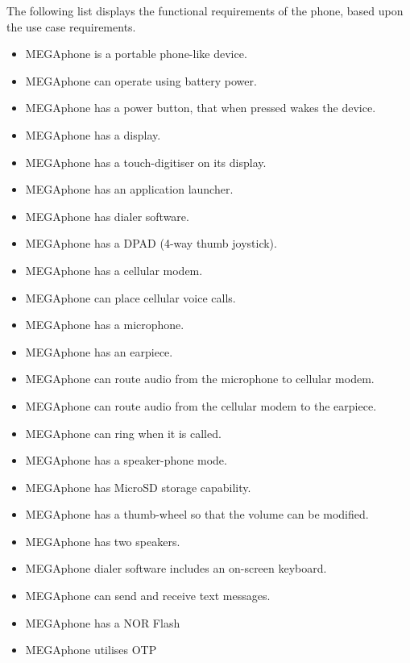 	The following list displays the functional requirements of the phone, based upon the use case requirements.\\
	\begin{itemize}
        \item MEGAphone is a portable phone-like device.
        \item MEGAphone can operate using battery power.
        \item MEGAphone has a power button, that when pressed wakes the device.
        \item MEGAphone has a display.
        \item MEGAphone has a touch-digitiser on its display.
        \item MEGAphone has an application launcher.
        \item MEGAphone has dialer software.
        \item MEGAphone has a DPAD (4-way thumb joystick).
        \item MEGAphone has a cellular modem.
        \item MEGAphone can place cellular voice calls.
        \item MEGAphone has a microphone. 
        \item MEGAphone has an earpiece.
        \item MEGAphone can route audio from the microphone to cellular modem.
        \item MEGAphone can route audio from the cellular modem to the earpiece.
        \item MEGAphone can ring when it is called.
        \item MEGAphone has a speaker-phone mode.
	\item MEGAphone has MicroSD storage capability.
	\item MEGAphone has a thumb-wheel so that the volume can be modified.
	\item MEGAphone has two speakers.
	\item MEGAphone dialer software includes an on-screen keyboard.
	\item MEGAphone can send and receive text messages.
	\item MEGAphone has a NOR Flash
	\item MEGAphone utilises OTP
	\end{itemize}

